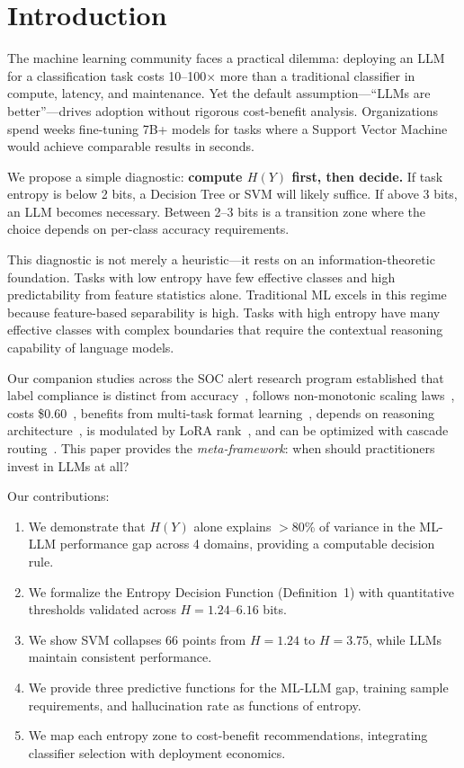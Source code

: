 \documentclass[review,3p]{elsarticle}
\begin{document}
\section{Introduction}

The machine learning community faces a practical dilemma: deploying an LLM for a classification task costs 10--100$\times$ more than a traditional classifier in compute, latency, and maintenance. Yet the default assumption---``LLMs are better''---drives adoption without rigorous cost-benefit analysis. Organizations spend weeks fine-tuning 7B+ models for tasks where a Support Vector Machine would achieve comparable results in seconds.

We propose a simple diagnostic: \textbf{compute $H(Y)$ first, then decide.} If task entropy is below 2 bits, a Decision Tree or SVM will likely suffice. If above 3 bits, an LLM becomes necessary. Between 2--3 bits is a transition zone where the choice depends on per-class accuracy requirements.

This diagnostic is not merely a heuristic---it rests on an information-theoretic foundation. Tasks with low entropy have few effective classes and high predictability from feature statistics alone. Traditional ML excels in this regime because feature-based separability is high. Tasks with high entropy have many effective classes with complex boundaries that require the contextual reasoning capability of language models.

Our companion studies across the SOC alert research program established that label compliance is distinct from accuracy~\cite{p3}, follows non-monotonic scaling laws~\cite{p6}, costs \$0.60~\cite{p7}, benefits from multi-task format learning~\cite{p15}, depends on reasoning architecture~\cite{p21}, is modulated by LoRA rank~\cite{p22}, and can be optimized with cascade routing~\cite{p5}. This paper provides the \emph{meta-framework}: when should practitioners invest in LLMs at all?

Our contributions:
\begin{enumerate}
\item We demonstrate that $H(Y)$ alone explains $>$80\% of variance in the ML-LLM performance gap across 4 domains, providing a computable decision rule.
\item We formalize the Entropy Decision Function (Definition~1) with quantitative thresholds validated across $H = 1.24$--$6.16$ bits.
\item We show SVM collapses 66 points from $H=1.24$ to $H=3.75$, while LLMs maintain consistent performance.
\item We provide three predictive functions for the ML-LLM gap, training sample requirements, and hallucination rate as functions of entropy.
\item We map each entropy zone to cost-benefit recommendations, integrating classifier selection with deployment economics.
\end{enumerate}
\end{document}
